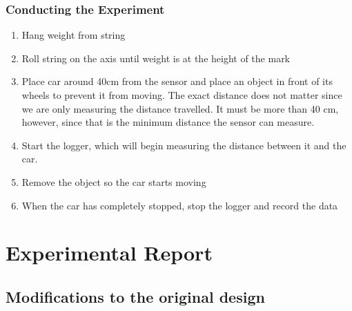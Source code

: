 \documentclass[titlepage,12pt]{article}
\let\oldsection\section
\renewcommand\section{\FloatBarrier\oldsection}
\let\oldsubsection\subsection
\renewcommand\subsection{\FloatBarrier \oldsubsection}
\begin{document}
\subsubsection{Conducting the Experiment}

\begin{enumerate}
    \item Hang weight from string
    \item Roll string on the axis until weight is at the height of the mark
    \item Place car around 40cm from the sensor and place an object in front of its wheels
        to prevent it from moving.  The exact distance does not matter since we are only
        measuring the distance travelled. It must be more than 40 cm, however, since that is
        the minimum distance the sensor can measure.  
    \item Start the logger, which will begin measuring the distance between it and the car.
    \item Remove the object so the car starts moving
    \item When the car has completely stopped, stop the logger and record the data
\end{enumerate}

\section{Experimental Report}

\subsection{Modifications to the original design}
\end{document}
